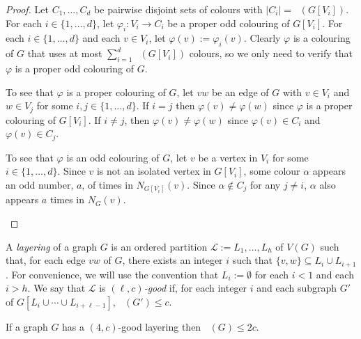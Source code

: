 \documentclass{patmorin}
\DeclareMathOperator{\odd}{\chi_o}
\begin{document}
\begin{proof}
  Let $C_1,\ldots,C_d$ be pairwise disjoint sets of colours with $|C_i|=\odd(G[V_i])$.  For each $i\in\{1,\ldots,d\}$, let $\varphi_i:V_i\to C_i$ be a proper odd colouring of $G[V_i]$.  For each $i\in\{1,\ldots,d\}$ and each $v\in V_i$, let $\varphi(v):=\varphi_i(v)$.  Clearly $\varphi$ is a colouring of $G$ that uses at most $\sum_{i=1}^d \odd(G[V_i])$ colours, so we only need to verify that $\varphi$ is a proper odd colouring of $G$.
  \begin{compactitem}
    \item To see that $\varphi$ is a proper colouring of $G$, let $vw$ be an edge of $G$ with $v\in V_i$ and $w\in V_j$ for some $i,j\in\{1,\ldots,d\}$. If $i=j$ then $\varphi(v)\neq\varphi(w)$ since $\varphi$ is a proper colouring of $G[V_i]$.  If $i\neq j$, then $\varphi(v)\neq\varphi(w)$ since $\varphi(v)\in C_i$ and $\varphi(v)\in C_j$.

    \item To see that $\varphi$ is an odd colouring of $G$, let $v$ be a vertex in $V_i$ for some $i\in\{1,\ldots,d\}$.   Since $v$ is not an isolated vertex in $G[V_i]$, some colour $\alpha$ appears an odd number, $a$, of times in $N_{G[V_i]}(v)$.  Since $\alpha\not\in C_j$ for any $j\neq i$, $\alpha$ also appears $a$ times in $N_G(v)$. \qedhere
  \end{compactitem}
\end{proof}

A \emph{layering} of a graph $G$ is an ordered partition $\mathcal{L}:=L_1,\ldots,L_h$ of $V(G)$ such that, for each edge $vw$ of $G$, there exists an integer $i$ such that $\{v,w\}\subseteq L_i\cup L_{i+1}$.  For convenience, we will use the convention that $L_i:=\emptyset$ for each $i < 1$ and each $i> h$.  We say that $\mathcal{L}$ is \emph{$(\ell,c)$-good} if, for each integer $i$ and each subgraph $G'$ of $G[L_i\cup\cdots\cup L_{i+\ell-1}]$, $\odd(G')\le c$.


\begin{lem}\label{four_good}
  If a graph $G$ has a $(4,c)$-good layering then $\odd(G)\le 2c$.
\end{lem}
\end{document}
